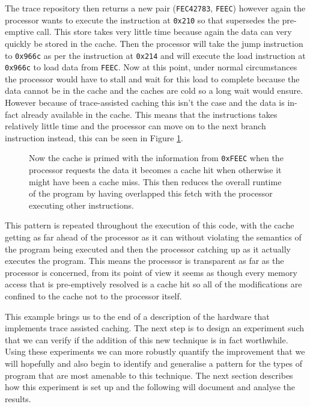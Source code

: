 The trace repository then returns a new pair (\texttt{FEC42783}, \texttt{FEEC}) however again the processor wants to execute the instruction at \texttt{0x210} so that supersedes the pre-emptive call. This store takes very little time because again the data can very quickly be stored in the cache. Then the processor will take the jump instruction to \texttt{0x966c} as per the instruction at \texttt{0x214} and will execute the load instruction at \texttt{0x966c} to load data from \texttt{FEEC}. Now at this point, under normal circumstances the processor would have to stall and wait for this load to complete because the data cannot be in the cache and the caches are cold so a long wait would ensure. However because of trace-assisted caching this isn't the case and the data is in-fact already available in the cache. This means that the instructions takes relatively little time and the processor can move on to the next branch instruction instead, this can be seen in Figure \ref{fig:trace-assisted-cache-example-step-5}.

\begin{figure}[htbp]
	
	\caption{Now the cache is primed with the information from \texttt{0xFEEC} when the processor requests the data it becomes a cache hit when otherwise it might have been a cache miss. This then reduces the overall runtime of the program by having overlapped this fetch with the processor executing other instructions.}
	\label{fig:trace-assisted-cache-example-step-5}
\end{figure}

This pattern is repeated throughout the execution of this code, with the cache getting as far ahead of the processor as it can without violating the semantics of the program being executed and then the processor catching up as it actually executes the program. This means the processor is transparent as far as the processor is concerned, from its point of view it seems as though every memory access that is pre-emptively resolved is a cache hit so all of the modifications are confined to the cache not to the processor itself. 

This example brings us to the end of a description of the hardware that implements trace assisted caching. The next step is to design an experiment such that we can verify if the addition of this new technique is in fact worthwhile. Using these experiments we can more robustly quantify the improvement that we will hopefully and also begin to identify and generalise a pattern for the types of program that are most amenable to this technique. The next section describes how this experiment is set up and the following will document and analyse the results.

